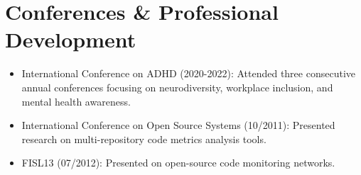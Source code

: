 \section{Conferences \& Professional Development}
\begin{itemize}
    \item \footnotesize{International Conference on ADHD (2020-2022):}\scriptsize{ Attended three 
        consecutive annual conferences focusing on neurodiversity, workplace inclusion, and mental 
        health awareness.}
    \item \footnotesize{International Conference on Open Source Systems (10/2011):}\scriptsize{ 
        Presented research on multi-repository code metrics analysis tools.}
    \item \footnotesize{FISL13 (07/2012):}\scriptsize{ Presented on open-source code monitoring 
        networks.}
\end{itemize}